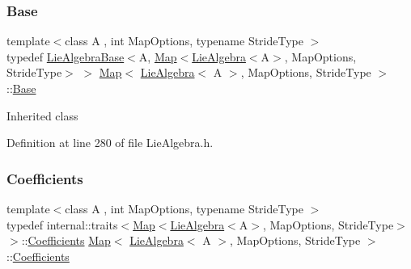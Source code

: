 \subsubsection{\texorpdfstring{Base}{Base}}
{\footnotesize\ttfamily template$<$class A , int Map\+Options, typename Stride\+Type $>$ \\
typedef \hyperlink{class_lie_algebra_base}{Lie\+Algebra\+Base}$<$A, \hyperlink{class_map_3_01_lie_algebra_3_01_a_01_4_00_01_map_options_00_01_stride_type_01_4_a5e320dd14d4d47929d7a4d48014a735f}{Map}$<$\hyperlink{class_lie_algebra}{Lie\+Algebra}$<$A$>$, Map\+Options, Stride\+Type$>$ $>$ \hyperlink{class_map_3_01_lie_algebra_3_01_a_01_4_00_01_map_options_00_01_stride_type_01_4_a5e320dd14d4d47929d7a4d48014a735f}{Map}$<$ \hyperlink{class_lie_algebra}{Lie\+Algebra}$<$ A $>$, Map\+Options, Stride\+Type $>$\+::\hyperlink{class_map_3_01_lie_algebra_3_01_a_01_4_00_01_map_options_00_01_stride_type_01_4_a1f44b1c76739ca5f9a17c23109c32488}{Base}\hspace{0.3cm}{\ttfamily [protected]}}

Inherited class 

Definition at line 280 of file Lie\+Algebra.\+h.

\hypertarget{class_map_3_01_lie_algebra_3_01_a_01_4_00_01_map_options_00_01_stride_type_01_4_a32e1cab48693733071a98e9f558d4c82}{}\label{class_map_3_01_lie_algebra_3_01_a_01_4_00_01_map_options_00_01_stride_type_01_4_a32e1cab48693733071a98e9f558d4c82} 
\subsubsection{\texorpdfstring{Coefficients}{Coefficients}}
{\footnotesize\ttfamily template$<$class A , int Map\+Options, typename Stride\+Type $>$ \\
typedef internal\+::traits$<$\hyperlink{class_map_3_01_lie_algebra_3_01_a_01_4_00_01_map_options_00_01_stride_type_01_4_a5e320dd14d4d47929d7a4d48014a735f}{Map}$<$\hyperlink{class_lie_algebra}{Lie\+Algebra}$<$A$>$, Map\+Options, Stride\+Type$>$ $>$\+::\hyperlink{class_map_3_01_lie_algebra_3_01_a_01_4_00_01_map_options_00_01_stride_type_01_4_a32e1cab48693733071a98e9f558d4c82}{Coefficients} \hyperlink{class_map_3_01_lie_algebra_3_01_a_01_4_00_01_map_options_00_01_stride_type_01_4_a5e320dd14d4d47929d7a4d48014a735f}{Map}$<$ \hyperlink{class_lie_algebra}{Lie\+Algebra}$<$ A $>$, Map\+Options, Stride\+Type $>$\+::\hyperlink{class_map_3_01_lie_algebra_3_01_a_01_4_00_01_map_options_00_01_stride_type_01_4_a32e1cab48693733071a98e9f558d4c82}{Coefficients}}

